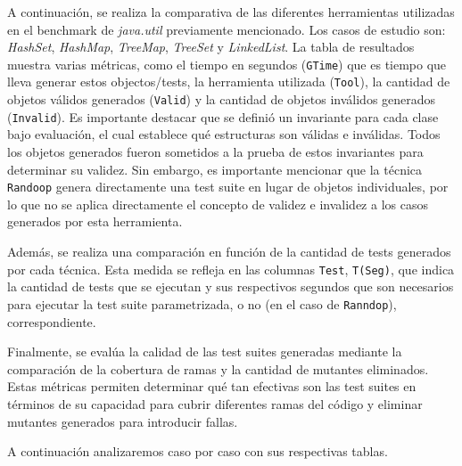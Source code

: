A continuación, se realiza la comparativa de las diferentes herramientas utilizadas en el benchmark de \emph{java.util} previamente mencionado. Los casos de estudio son: \emph{HashSet}, \emph{HashMap}, \emph{TreeMap}, \emph{TreeSet} y \emph{LinkedList}. La tabla de resultados muestra varias métricas, como el tiempo en segundos (\texttt{GTime}) que es tiempo que lleva generar estos objectos/tests, la herramienta utilizada (\texttt{Tool}), la cantidad de objetos válidos generados (\texttt{Valid}) y la cantidad de objetos inválidos generados (\texttt{Invalid}).
Es importante destacar que se definió un invariante para cada clase bajo evaluación, el cual establece qué estructuras son válidas e inválidas. Todos los objetos generados fueron sometidos a la prueba de estos invariantes para determinar su validez. Sin embargo, es importante mencionar que la técnica \texttt{Randoop} genera directamente una test suite en lugar de objetos individuales, por lo que no se aplica directamente el concepto de validez e invalidez a los casos generados por esta herramienta.

Además, se realiza una comparación en función de la cantidad de tests generados por cada técnica. Esta medida se refleja en las columnas \texttt{Test}, \texttt{T(Seg)}, que indica la cantidad de tests que se ejecutan y sus respectivos segundos que son necesarios para ejecutar la test suite parametrizada, o no (en el caso de \texttt{Ranndop}), correspondiente.

Finalmente, se evalúa la calidad de las test suites generadas mediante la comparación de la cobertura de ramas y la cantidad de mutantes eliminados. Estas métricas permiten determinar qué tan efectivas son las test suites en términos de su capacidad para cubrir diferentes ramas del código y eliminar mutantes generados para introducir fallas.

A continuación analizaremos caso por caso con sus respectivas tablas.




